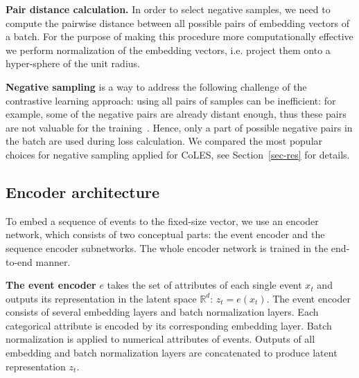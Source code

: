 \documentclass[sigconf, anonymous]{acmart}
\newcommand{\R}{\mathbb{R}}
\begin{document}

\textbf{Pair distance calculation.} In order to select negative samples, we need to compute the pairwise distance between all possible pairs of embedding vectors of a batch. For the purpose of making this procedure more computationally effective we perform normalization of the embedding vectors, i.e. project them onto a hyper-sphere of the unit radius. 

\textbf{Negative sampling} is a way to address the following challenge of the contrastive learning approach: using all pairs of samples can be inefficient: for example, some of the negative pairs are already distant enough, thus these pairs are not valuable for the training~\citep{SimoSerra2015DiscriminativeLO, Schroff2015FaceNetAU}. Hence, only a part of possible negative pairs in the batch are used during loss calculation. We compared the most popular choices for negative sampling applied for CoLES, see Section~\ref{sec-res} for details.

\subsection{Encoder architecture} \label{sec-enc-arch}

To embed a sequence of events to the fixed-size vector, we use an encoder network, which consists of two conceptual parts: the event encoder and the sequence encoder subnetworks. The whole encoder network is trained in the end-to-end manner.

\textbf{The event encoder} $e$ takes the set of attributes of each single event $x_t$ and outputs its representation in the latent space $\R^d$: $z_t = e(x_t)$. The event encoder consists of several embedding layers and batch normalization layers. Each categorical attribute is encoded by its corresponding embedding layer. Batch normalization is applied to numerical attributes of events. Outputs of all embedding and batch normalization layers are concatenated to produce latent representation $z_t$.
\end{document}
